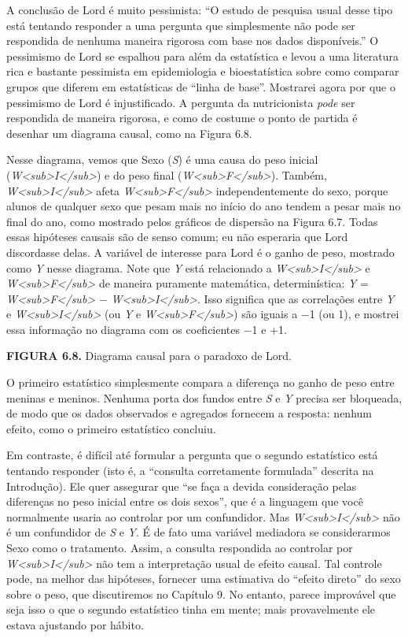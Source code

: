 \documentclass[11pt,a5paper,twoside]{book}
\begin{document}
A conclusão de Lord é muito pessimista: “O estudo de pesquisa usual desse tipo está tentando responder a uma pergunta que simplesmente não pode ser respondida de nenhuma maneira rigorosa com base nos dados disponíveis.” O pessimismo de Lord se espalhou para além da estatística e levou a uma literatura rica e bastante pessimista em epidemiologia e bioestatística sobre como comparar grupos que diferem em estatísticas de “linha de base”. Mostrarei agora por que o pessimismo de Lord é injustificado. A pergunta da nutricionista \textit{pode} ser respondida de maneira rigorosa, e como de costume o ponto de partida é desenhar um diagrama causal, como na Figura 6.8.

Nesse diagrama, vemos que Sexo (\textit{S}) é uma causa do peso inicial (\textit{W<sub>I</sub>}) e do peso final (\textit{W<sub>F</sub>}). Também, \textit{W<sub>I</sub>} afeta \textit{W<sub>F</sub>} independentemente do sexo, porque alunos de qualquer sexo que pesam mais no início do ano tendem a pesar mais no final do ano, como mostrado pelos gráficos de dispersão na Figura 6.7. Todas essas hipóteses causais são de senso comum; eu não esperaria que Lord discordasse delas. A variável de interesse para Lord é o ganho de peso, mostrado como \textit{Y} nesse diagrama. Note que \textit{Y} está relacionado a \textit{W<sub>I</sub>} e \textit{W<sub>F</sub>} de maneira puramente matemática, determinística: \textit{Y} = \textit{W<sub>F</sub>} − \textit{W<sub>I</sub>}. Isso significa que as correlações entre \textit{Y} e \textit{W<sub>I</sub>} (ou \textit{Y} e \textit{W<sub>F</sub>}) são iguais a −1 (ou 1), e mostrei essa informação no diagrama com os coeficientes −1 e +1.

\textbf{FIGURA 6.8.} Diagrama causal para o paradoxo de Lord.

O primeiro estatístico simplesmente compara a diferença no ganho de peso entre meninas e meninos. Nenhuma porta dos fundos entre \textit{S} e \textit{Y} precisa ser bloqueada, de modo que os dados observados e agregados fornecem a resposta: nenhum efeito, como o primeiro estatístico concluiu.

Em contraste, é difícil até formular a pergunta que o segundo estatístico está tentando responder (isto é, a “consulta corretamente formulada” descrita na Introdução). Ele quer assegurar que “se faça a devida consideração pelas diferenças no peso inicial entre os dois sexos”, que é a linguagem que você normalmente usaria ao controlar por um confundidor. Mas \textit{W<sub>I</sub>} não é um confundidor de \textit{S} e \textit{Y}. É de fato uma variável mediadora se considerarmos Sexo como o tratamento. Assim, a consulta respondida ao controlar por \textit{W<sub>I</sub>} não tem a interpretação usual de efeito causal. Tal controle pode, na melhor das hipóteses, fornecer uma estimativa do “efeito direto” do sexo sobre o peso, que discutiremos no Capítulo 9. No entanto, parece improvável que seja isso o que o segundo estatístico tinha em mente; mais provavelmente ele estava ajustando por hábito.
\end{document}
